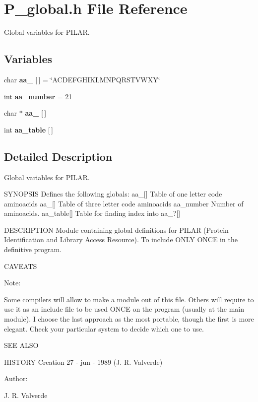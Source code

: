\section{P\_\-global.h File Reference}
\label{P__global_8h}
Global variables for PILAR. 


\subsection*{Variables}
\begin{CompactItemize}
\item 
char {\bf aa\_} [$\,$] = \char`\"{}ACDEFGHIKLMNPQRSTVWXY\char`\"{}
\item 
int {\bf aa\_\-number} = 21
\item 
char $\ast$ {\bf aa\_} [$\,$]
\item 
int {\bf aa\_\-table} [$\,$]
\end{CompactItemize}


\subsection{Detailed Description}
Global variables for PILAR.

 

 SYNOPSIS  Defines the following globals:  aa\_[] Table of one letter code aminoacids  aa\_[] Table of three letter code aminoacids  aa\_\-number Number of aminoacids.  aa\_\-table[] Table for finding index into aa\_\-?[]

DESCRIPTION  Module containing global definitions for  PILAR (Protein Identification and Library Access  Resource). To include ONLY ONCE in the definitive  program.

CAVEATS

\begin{Desc}
\item[Note: ]\par
 Some compilers will allow to make a module out  of this file. Others will require to use it as an  include file to be used ONCE on the program (usually  at the main module). I choose the last approach as the  most portable, though the first is more elegant. Check  your particular system to decide which one to use.\end{Desc}
SEE ALSO

HISTORY  Creation 27 - jun - 1989 (J. R. Valverde)

\begin{Desc}
\item[Author: ]\par
J. R. Valverde\end{Desc}


